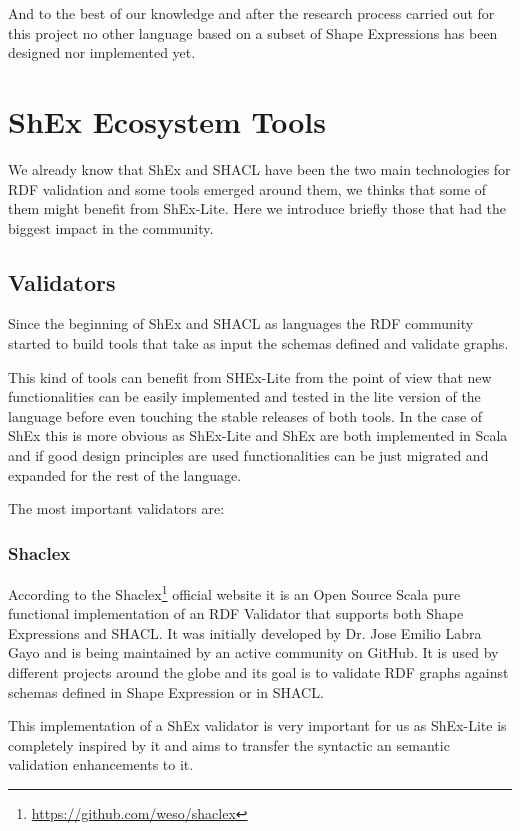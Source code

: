 \bigskip

And to the best of our knowledge and after the research process carried out for this
project no other language based on a subset of Shape Expressions has been designed nor implemented yet.


\section{ShEx Ecosystem Tools}
\label{sec:related-work-shex-ecosystem}

We already know that ShEx and SHACL have been the two main technologies for RDF validation and some tools
emerged around them, we thinks that some of them might benefit from ShEx-Lite. Here we introduce briefly
those that had the biggest impact in the community.

\subsection{Validators}
Since the beginning of ShEx and SHACL as languages the RDF community started to build tools that take as
input the schemas defined and validate graphs.

This kind of tools can benefit from SHEx-Lite from the point of view that new functionalities can be easily
implemented and tested in the lite version of the language before even touching the stable releases of both
tools. In the case of ShEx this is more obvious as ShEx-Lite and ShEx are both implemented in Scala and if
good design principles are used functionalities can be just migrated and expanded for the rest of the language.

The most important validators are:

\subsubsection{Shaclex}
According to the Shaclex\footnote{\url{https://github.com/weso/shaclex}} official website it is an Open
Source Scala pure functional implementation of an RDF Validator that supports both Shape Expressions and
SHACL. It was initially developed by Dr. Jose Emilio Labra Gayo and is being maintained by an active
community on GitHub. It is used by different projects around the globe and its goal is to validate RDF
graphs against schemas defined in Shape Expression or in SHACL.

This implementation of a ShEx validator is very important for us as ShEx-Lite is completely inspired by it
and aims to transfer the syntactic an semantic validation enhancements to it.

